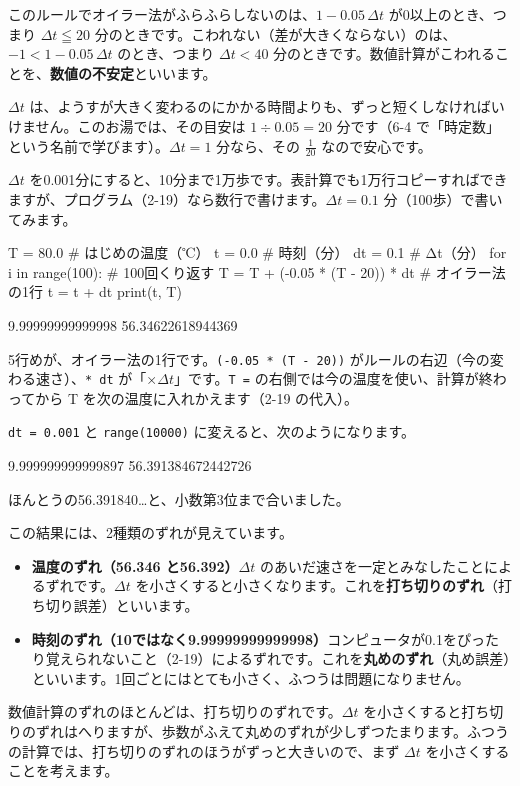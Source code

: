 \begin{seikaku}
このルールでオイラー法がふらふらしないのは、$1-0.05\,\Delta t$ が0以上のとき、つまり $\Delta t\leqq20$ 分のときです。こわれない（差が大きくならない）のは、$-1<1-0.05\,\Delta t$ のとき、つまり $\Delta t<40$ 分のときです。数値計算がこわれることを、\textbf{数値の不安定}といいます。
\end{seikaku}

$\Delta t$ は、ようすが大きく変わるのにかかる時間よりも、ずっと短くしなければいけません。このお湯では、その目安は $1\div0.05=20$ 分です（6-4 で「時定数」という名前で学びます）。$\Delta t=1$ 分なら、その $\frac{1}{20}$ なので安心です。


\label{bk:6-2:python}$\Delta t$ を0.001分にすると、10分まで1万歩です。表計算でも1万行コピーすればできますが、プログラム（2-19）なら数行で書けます。$\Delta t=0.1$ 分（100歩）で書いてみます。\par\nobreak
\begin{bkcode}[Python]
T = 80.0          \# はじめの温度（℃）
t = 0.0           \# 時刻（分）
dt = 0.1          \# Δt（分）
for i in range(100):                  \# 100回くり返す
    T = T + (-0.05 * (T - 20)) * dt   \# オイラー法の1行
    t = t + dt
print(t, T)
\end{bkcode}
\begin{bkcodeout}
9.99999999999998 56.34622618944369
\end{bkcodeout}
5行めが、オイラー法の1行です。\texttt{(-0.05 * (T - 20))} がルールの右辺（今の変わる速さ）、\texttt{* dt} が「×$\Delta t$」です。\texttt{T =} の右側では今の温度を使い、計算が終わってから T を次の温度に入れかえます（2-19 の代入）。

\texttt{dt = 0.001} と \texttt{range(10000)} に変えると、次のようになります。
\begin{bkcodeout}
9.999999999999897 56.391384672442726
\end{bkcodeout}
ほんとうの56.391840…と、小数第3位まで合いました。

この結果には、2種類のずれが見えています。
\begin{itemize}[leftmargin=1.6\zw, itemsep=2pt, topsep=2pt, label={\color{\bkTT}●}]
\item \textbf{温度のずれ（56.346 と56.392）}\quad $\Delta t$ のあいだ速さを一定とみなしたことによるずれです。$\Delta t$ を小さくすると小さくなります。これを\textbf{打ち切りのずれ}（打ち切り誤差）といいます。
\item \textbf{時刻のずれ（10ではなく9.99999999999998）}\quad コンピュータが0.1をぴったり覚えられないこと（2-19）によるずれです。これを\textbf{丸めのずれ}（丸め誤差）といいます。1回ごとにはとても小さく、ふつうは問題になりません。
\end{itemize}
数値計算のずれのほとんどは、打ち切りのずれです。$\Delta t$ を小さくすると打ち切りのずれはへりますが、歩数がふえて丸めのずれが少しずつたまります。ふつうの計算では、打ち切りのずれのほうがずっと大きいので、まず $\Delta t$ を小さくすることを考えます。

